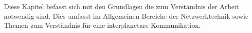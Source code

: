 \label{cap:grundlagen}
Diese Kapitel befasst sich mit den Grundlagen die zum Verst{\"a}ndnis der Arbeit
notwendig sind. Dies umfasst im Allgemeinen Bereiche der
Netzwerktechnik sowie Themen zum Verständnis f{\"u}r eine interplanetare
Kommunikation.
